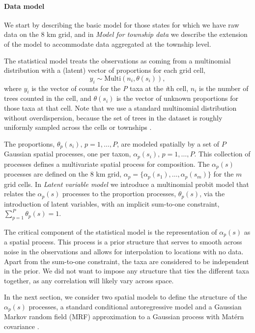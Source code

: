\documentclass[10pt,letterpaper]{article}
\newcommand{\matern}{Mat\'{e}rn }
\begin{document}
\paragraph*{Data model}

We start by describing the basic model for those states for which
we have raw data on the 8 km grid, and in \emph{Model for township data}
we describe the extension of the model to accommodate data aggregated
at the township level.

The statistical model treats the observations as coming from a multinomial
distribution with a (latent) vector of proportions for each grid cell,
\[
y_{i}\sim\mbox{Multi}(n_{i},\theta(s_{i})),
\]
where $y_{i}$ is the vector of counts for the \emph{P} taxa at the \emph{i}th
cell, $n_{i}$ is the number of trees counted in the cell, and $\theta(s_{i})$
is the vector of unknown proportions for those taxa at that cell.
Note that we use a standard multinomial distribution without overdispersion,
because the set of trees in the dataset is roughly uniformly sampled
across the cells or townships \cite{goring2015tr}.

The proportions, $\theta_{p}(s_{i}),\, p=1,\ldots,P$, are modeled
spatially by a set of $P$ Gaussian spatial processes, one per taxon,
$\alpha_{p}(s_{i}),\, p=1,\ldots,P$. This collection of processes
defines a multivariate spatial process for composition. The $\alpha_{p}(s)$
processes are defined on the 8 km grid, $\alpha_{p}=\{\alpha_{p}(s_{1}),\ldots,\alpha_{p}(s_{m})\}$
for the $m$ grid cells. In \emph{Latent variable model}
we introduce a multinomial probit model that relates the $\alpha_{p}(s)$
processes to the proportion processes, $\theta_{p}(s)$, via the introduction
of latent variables, with an implicit sum-to-one constraint, $\sum_{p=1}^{P}\theta_{p}(s)=1$.



The critical component of the statistical model is the representation
of $\alpha_{p}(s)$ as a spatial process. This process is a prior
structure that serves to smooth across noise in the observations and
allows for interpolation to locations with no data. Apart from the
sum-to-one constraint, the taxa are considered to be independent in
the prior. We did not want to impose any structure that ties the different
taxa together, as any correlation will likely vary across space.

In the next section, we consider two spatial models to define the
structure of the $\alpha_{p}(s)$ processes, a standard conditional
autoregressive model \cite{Bane:etal:2004} and a Gaussian Markov
random field (MRF) approximation to a Gaussian process with \matern
covariance \cite{Lind:etal:2011}. 
\end{document}
